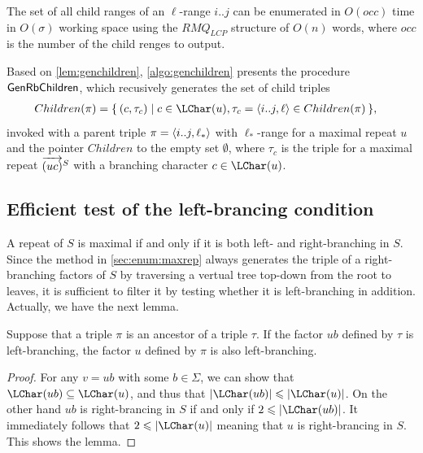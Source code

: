 \documentclass{article}
\begin{document}
\begin{lemma}\label{lem:genchildren}
  The set of all child ranges of an $\ell$-range $i..j$ can be enumerated in $O(occ)$ time in $O(\sigma)$ working space
  using the $RMQ_{LCP}$ structure of $O(n)$ words, 
where $occ$ is the number of the child renges to output.  
\end{lemma}

Based on \cref{lem:genchildren}, \cref{algo:genchildren} presents the procedure $\textsf{GenRbChildren}_{}$, which recusively generates the set of child triples
\begin{align}
  Children(\pi)
  &= \sete{ (c, \tau_c) \mid c \in \LChar(u), \tau_c = \pair{i..j, \ell} \in Children(\pi)}, 
\end{align}
invoked with a parent triple $\pi = \langle i..j, \ell_*\rangle$ with $\ell_*$-range for a maximal repeat $u$ and the pointer $Children$ to the empty set $\emptyset$,
where $\tau_c$ is the triple for a maximal repeat $\overrightarrow{(uc)}^{S}$ with a branching character $c \in \LChar(u)$.

\subsection{Efficient test of the left-brancing condition}

A repeat of $S$ is maximal if and only if it is both left- and right-branching in $S$. Since the method in \cref{sec:enum:maxrep} always generates the triple of a right-branching factors of $S$ by traversing a vertual tree top-down from the root to leaves, it is sufficient to filter it by testing whether it is left-branching in addition. Actually, we have the next lemma. 

\begin{lemmarep}\label{lem:prune:leftbranch}
Suppose that a triple $\pi$ is an ancestor of a triple $\tau$. If the factor $ub$ defined by $\tau$ is left-branching, the factor $u$ defined by $\pi$ is also left-branching. 
\end{lemmarep}

\begin{proof}
  For any $v = ub$ with some $b \in \Sigma$, we can show that
  $\LChar(ub) \subseteq \LChar(u)$, and thus that $|\LChar(ub)| \le |\LChar(u)|$. On the other hand $ub$ is right-brancing in $S$ if and only if $2\le |\LChar(ub)|$. It immediately follows that $2 \le |\LChar(u)|$ meaning that $u$ is right-brancing in $S$. This shows the lemma. 
\end{proof}
\end{document}
